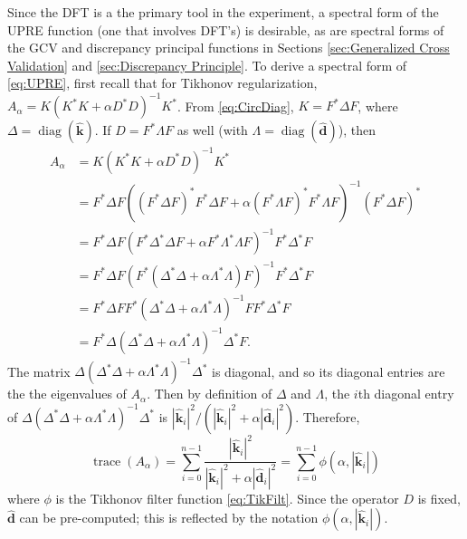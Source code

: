 \documentclass[12pt]{article}
\newcommand{\kdis}{\mathbf{k}}
\newcommand{\kmat}{K}	%
\newcommand{\ddis}{\mathbf{d}}	%
\newcommand{\ctrans}{*}	%
\newcommand{\trace}{\operatorname{trace}}	%
\newcommand{\diag}{\operatorname{diag}}
\newcommand{\regparam}{\alpha}
\newcommand{\filt}{\phi}
\newcommand{\A}{A_{\regparam}}	%
\begin{document}
Since the DFT is a the primary tool in the experiment, a spectral form of the UPRE function (one that involves DFT's) is desirable, as are spectral forms of the GCV and discrepancy principal functions in Sections \ref{sec:Generalized Cross Validation} and \ref{sec:Discrepancy Principle}. To derive a spectral form of \eqref{eq:UPRE}, first recall that for Tikhonov regularization, $\A = \kmat(\kmat^\ctrans\kmat + \regparam{D^\ctrans}D)^{-1}\kmat^\ctrans$. From \eqref{eq:CircDiag}, $\kmat = F^*\Delta{F}$, where $\Delta = \diag(\widehat{\kdis})$. If $D = F^\ctrans\Lambda{F}$ as well (with $\Lambda = \diag(\widehat{\ddis})$), then
\begin{align*}
\A &= \kmat(\kmat^\ctrans\kmat + \regparam{D^\ctrans}D)^{-1}\kmat^\ctrans \\
&= F^*\Delta{F}((F^*\Delta{F})^\ctrans F^\ctrans\Delta{F} + \regparam(F^\ctrans\Lambda{F})^\ctrans F^\ctrans\Lambda{F})^{-1}(F^*\Delta{F})^\ctrans \\
&= F^\ctrans\Delta{F}(F^\ctrans\Delta^\ctrans\Delta{F} + \regparam{F^\ctrans\Lambda^\ctrans\Lambda{F}})^{-1}F^\ctrans\Delta^\ctrans{F} \\
&= F^\ctrans\Delta{F}(F^\ctrans(\Delta^\ctrans\Delta + \regparam\Lambda^\ctrans\Lambda)F)^{-1}F^\ctrans\Delta^\ctrans{F} \\
&= F^\ctrans\Delta{F}F^\ctrans(\Delta^\ctrans\Delta + \regparam\Lambda^\ctrans\Lambda)^{-1}FF^\ctrans\Delta^\ctrans{F} \\
&= F^\ctrans\Delta(\Delta^\ctrans\Delta + \regparam\Lambda^\ctrans\Lambda)^{-1}\Delta^\ctrans{F}.
\end{align*}
The matrix $\Delta(\Delta^\ctrans\Delta + \regparam\Lambda^\ctrans\Lambda)^{-1}\Delta^\ctrans$ is diagonal, and so its diagonal entries are the the eigenvalues of $\A$. Then by definition of $\Delta$ and $\Lambda$, the $i$th diagonal entry of $\Delta(\Delta^\ctrans\Delta + \regparam\Lambda^\ctrans\Lambda)^{-1}\Delta^\ctrans$ is $|\widehat{\kdis}_i|^2/(|\widehat{\kdis}_i|^2 + \regparam|\widehat{\ddis}_i|^2)$. Therefore,
\begin{equation}
\trace(\A) = \sum_{i = 0}^{n-1} \frac{|\widehat{\kdis}_i|^2}{|\widehat{\kdis}_i|^2 + \regparam|\widehat{\ddis}_i|^2} = \sum_{i = 0}^{n-1} \filt(\regparam,|\widehat{\kdis}_i|)
\label{eq:TraceUPRE}
\end{equation}
where $\filt$ is the Tikhonov filter function \eqref{eq:TikFilt}. Since the operator $D$ is fixed, $\widehat{\ddis}$ can be pre-computed; this is reflected by the notation $\filt(\regparam,|\widehat{\kdis}_i|)$. \par
\end{document}
